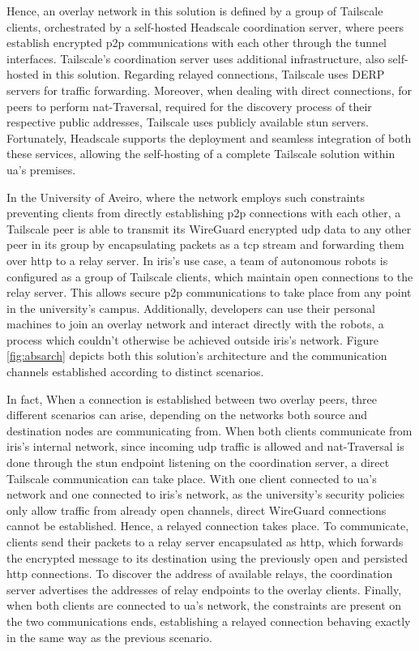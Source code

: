 \documentclass[11pt,twoside,a4paper]{report}
\begin{document}
Hence, an overlay network in this solution is defined by a group of Tailscale clients, orchestrated by a self-hosted Headscale coordination server, where peers establish encrypted \ac{p2p} communications with each other through the tunnel interfaces. Tailscale's coordination server uses additional infrastructure, also self-hosted in this solution. Regarding relayed connections, Tailscale uses \ac{DERP} servers for traffic forwarding. Moreover, when dealing with direct connections, for peers to perform \ac{nat}-Traversal, required for the discovery process of their respective public addresses, Tailscale uses publicly available \ac{stun} servers. Fortunately, Headscale supports the deployment and seamless integration of both these services, allowing the self-hosting of a complete Tailscale solution within \ac{ua}'s premises.

In the University of Aveiro, where the network employs such constraints preventing clients from directly establishing \ac{p2p} connections with each other, a Tailscale peer is able to transmit its WireGuard encrypted \ac{udp} data to any other peer in its group by encapsulating packets as a \ac{tcp} stream and forwarding them over \ac{http} to a relay server. In \ac{iris}'s use case, a team of autonomous robots is configured as a group of Tailscale clients, which maintain open connections to the relay server. This allows secure \ac{p2p} communications to take place from any point in the university's campus. Additionally, developers can use their personal machines to join an overlay network and interact directly with the robots, a process which couldn't otherwise be achieved outside \ac{iris}'s network. Figure \ref{fig:absarch} depicts both this solution's architecture and the communication channels established according to distinct scenarios.

In fact, When a connection is established between two overlay peers, three different scenarios can arise, depending on the networks both source and destination nodes are communicating from. When both clients communicate from \ac{iris}'s internal network, since incoming \ac{udp} traffic is allowed and \ac{nat}-Traversal is done through the \ac{stun} endpoint listening on the coordination server, a direct Tailscale communication can take place. With one client connected to \ac{ua}'s network and one connected to \ac{iris}'s network, as the university's security policies only allow traffic from already open channels, direct WireGuard connections cannot be established. Hence, a relayed connection takes place. To communicate, clients send their packets to a relay server encapsulated as \ac{http}, which forwards the encrypted message to its destination using the previously open and persisted \ac{http} connections. To discover the address of available relays, the coordination server advertises the addresses of relay endpoints to the overlay clients. Finally, when both clients are connected to \ac{ua}'s network, the constraints are present on the two communications ends, establishing a relayed connection behaving exactly in the same way as the previous scenario.
\end{document}
